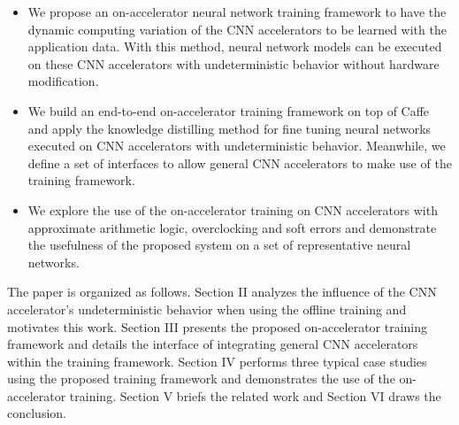 \begin{itemize}
	\item We propose an on-accelerator neural network training framework to 
		have the dynamic computing variation of the CNN accelerators to be 
		learned with the application data. With this method, neural 
		network models can be executed on these CNN accelerators with 
		undeterministic behavior without hardware modification.

	\item We build an end-to-end on-accelerator training framework on top of Caffe
		and apply the knowledge distilling method for fine tuning neural networks 
		executed on CNN accelerators with undeterministic behavior. Meanwhile, we 
		define a set of interfaces to allow general CNN accelerators 
		to make use of the training framework.

	\item We explore the use of the on-accelerator training on CNN accelerators 
		with approximate arithmetic logic, overclocking and soft errors and 
		demonstrate the usefulness of the proposed system on a set of 
		representative neural networks.
\end{itemize}
The paper is organized as follows. Section II analyzes the influence of 
the CNN accelerator's undeterministic behavior when using the offline 
training and motivates this work. Section III presents the 
proposed on-accelerator training framework and 
details the interface of integrating general CNN accelerators within the 
training framework. Section IV performs three typical case studies using the 
proposed training framework and demonstrates the use of the on-accelerator 
training. Section V briefs the related work and Section VI draws the conclusion. 


